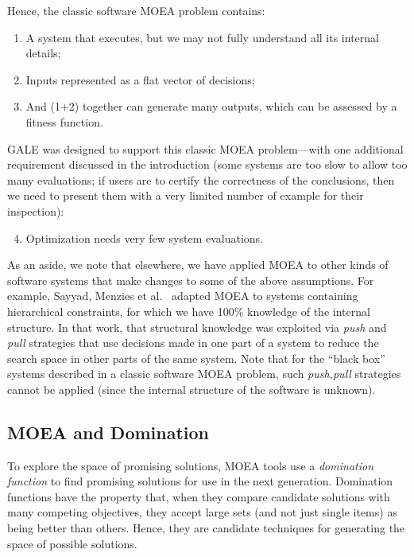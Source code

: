 \documentclass[10pt,journal,compsoc]{IEEEtran}
\newcommand{\be}{\begin{enumerate}}
\newcommand{\ee}{\end{enumerate}}
\newenvironment{changed}{\par}{\par}
\begin{document}
\begin{changed}
Hence, the classic software MOEA problem contains:\be
\item
 A system that executes, but we may not fully understand all its internal details;
\item
Inputs represented as a flat vector of decisions;
\item And (1+2) together can 
generate many outputs, which can be assessed by a
fitness function.
\ee
GALE was designed to support this classic MOEA problem---with one additional requirement discussed in the introduction (some systems are too slow to allow too many evaluations; if users are to certify the correctness of the conclusions, then we need to present them with a very limited number of example for their inspection):
\begin{enumerate}
\setcounter{enumi}{3}
\item Optimization needs very few system evaluations.
\end{enumerate}
As an aside, we note that elsewhere, we have applied MOEA to other kinds of software systems that make changes to some of the above assumptions. 
For example, Sayyad, Menzies et al.~\cite{sayyad13a,sayyad13b} adapted MOEA to systems containing hierarchical  constraints, for which we have  100\% knowledge of the internal structure.
In that work, that structural knowledge was exploited via {\em push} and {\em pull} strategies that use decisions made in one part of a system to reduce the search space in other parts of the same system. 
Note that for the ``black box'' systems described in a classic software MOEA problem, such {\em push,pull} strategies cannot be applied (since the internal structure of the software is unknown).
\end{changed}

\subsection{MOEA and Domination}\label{sec:cdom}

To explore the space of promising solutions, MOEA tools use a {\em  domination function} to find promising solutions for use in the next generation. 
Domination functions have the property that, when they compare candidate solutions with many competing objectives, they accept large sets (and not just single items) as being better than others.
Hence, they are candidate techniques for generating the space of possible solutions.
\end{document}
